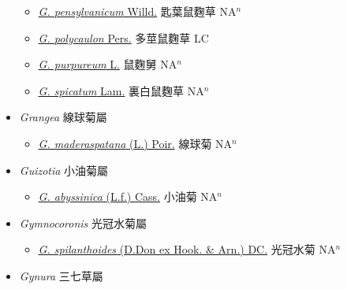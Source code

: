 \begin{itemize}
\begin{itemize}
        \item[] \href{http://www.theplantlist.org/tpl1.1/search?q=Gnaphalium+pensylvanicum}{\textit{G. pensylvanicum} Willd.}   匙葉鼠麴草 NA$^n$
        \item[] \href{http://www.theplantlist.org/tpl1.1/search?q=Gnaphalium+polycaulon}{\textit{G. polycaulon} Pers.}   多莖鼠麴草 LC
        \item[] \href{http://www.theplantlist.org/tpl1.1/search?q=Gnaphalium+purpureum}{\textit{G. purpureum} L.}   鼠麴舅 NA$^n$
        \item[] \href{http://www.theplantlist.org/tpl1.1/search?q=Gnaphalium+spicatum}{\textit{G. spicatum} Lam.}   裏白鼠麴草 NA$^n$
  \end{itemize}
 \item[] \textit{Grangea} 線球菊屬
                    
  \begin{itemize}
        \item[] \href{http://www.theplantlist.org/tpl1.1/search?q=Grangea+maderaspatana}{\textit{G. maderaspatana} (L.) Poir.}   線球菊 NA$^n$
  \end{itemize}
 \item[] \textit{Guizotia} 小油菊屬
                    
  \begin{itemize}
        \item[] \href{http://www.theplantlist.org/tpl1.1/search?q=Guizotia+abyssinica}{\textit{G. abyssinica} (L.f.) Cass.}   小油菊 NA$^n$
  \end{itemize}
 \item[] \textit{Gymnocoronis} 光冠水菊屬
                    
  \begin{itemize}
        \item[] \href{http://www.theplantlist.org/tpl1.1/search?q=Gymnocoronis+spilanthoides}{\textit{G. spilanthoides} (D.Don ex Hook. \& Arn.) DC.}   光冠水菊 NA$^n$
  \end{itemize}
 \item[] \textit{Gynura} 三七草屬
                    

\end{itemize}
